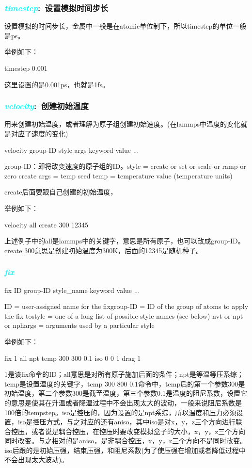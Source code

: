 \frame
{
	\frametitle{\textcolor{cyan}{\textit{timestep}}:~设置模拟时间步长}
	设置模拟的时间步长，金属中一般是在atomic单位制下，所以timestep的单位一般是ps。

举例如下：

timestep 0.001

这里设置的是0.001ps，也就是1fs。
}

\frame
{
	\frametitle{\textcolor{cyan}{\textit{velocity}}:~创建初始温度}
	用来创建初始温度，或者理解为原子组创建初始速度。(在lammps中温度的变化就是对应了速度的变化)

velocity group-ID style args keyword value ...

    group-ID：即将改变速度的原子组的ID。style = create or set or scale or ramp or zero
        create args = temp seed temp = temperature value (temperature units)

create后面要跟自己创建的初始温度，

举例如下：

velocity all create 300 12345

上述例子中的all是lammps中的关键字，意思是所有原子，也可以改成group-ID。create 300意思是创建初始温度为300K，后面的12345是随机种子。
}

\frame
{
	\frametitle{\textcolor{cyan}{\textit{fix}}}
	fix ID group-ID style_name keyword value ...

    ID = user-assigned name for the fixgroup-ID = ID of the group of atoms to apply the fix tostyle = one of a long list of possible style names (see below)
        nvt or npt or nphargs = arguments used by a particular style

举例如下：

fix 1 all npt temp 300 300 0.1 iso 0 0 1 drag 1

1是该fix命令的ID；all意思是对所有原子施加后面的条件；npt是等温等压系综；temp是设置温度的关键字，temp 300 800 0.1命令中，temp后的第一个参数300是初始温度，第二个参数300是截至温度，第三个参数0.1是温度的阻尼系数，设置它的意思是使其在升温或者降温过程中不会出现太大的波动，一般来说阻尼系数是100倍的tempstep。iso是控压的，因为设置的是npt系综，所以温度和压力必须设置，iso是控压方式，与之对应的还有aniso，其中iso是对x，y，z三个方向进行联合控压，或者说是耦合控压，在控压时要改变模拟盒子的大小，x，y，z三个方向同时改变。与之相对的是aniso，是非耦合控压，x，y，z三个方向不是同时改变。iso后跟的是初始压强，结束压强，和阻尼系数(为了使压强在增加或者降低过程中不会出现太大波动)。
}

